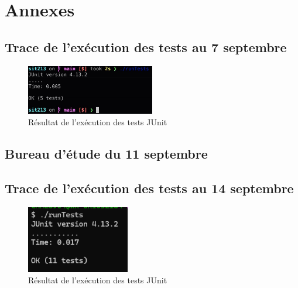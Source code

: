 \section*{Annexes}

\subsection{Trace de l'exécution des tests au 7 septembre}
\begin{figure}[H]
    \centering
    \includegraphics[width=0.5\textwidth]{img/runTests.jpg}
    \caption{Résultat de l'exécution des tests JUnit}
    \label{fig:tests1}
\end{figure}

\subsection{Bureau d'étude du 11 septembre}


\subsection{Trace de l'exécution des tests au 14 septembre}
\begin{figure}[H]
    \centering
    \includegraphics[width=0.4\textwidth]{img/etape2_tests_14sep.png}
    \caption{Résultat de l'exécution des tests JUnit}
    \label{fig:tests1}
\end{figure}